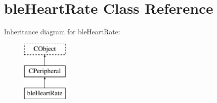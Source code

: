 \hypertarget{classble_heart_rate}{\section{ble\-Heart\-Rate Class Reference}
\label{classble_heart_rate}
}
Inheritance diagram for ble\-Heart\-Rate\-:\begin{figure}[H]
\begin{center}
\leavevmode
\includegraphics[height=3.000000cm]{classble_heart_rate}
\end{center}
\end{figure}
